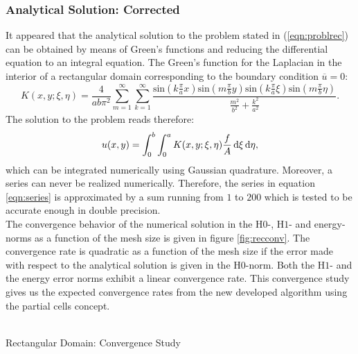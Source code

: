 \documentclass[a4paper,12pt]{article}
\makeatletter
\newcommand{\intd}{\,{\rm d}}
\newenvironment{figurehere}
  {\def\@captype{figure}}
  {}
\makeatother
\begin{document}
\subsubsection{Analytical Solution: Corrected}
It appeared that the analytical solution to the problem stated in (\ref{eqn:problrec}) can be obtained by means of Green's functions and reducing the differential equation to an integral equation. The Green's function for the Laplacian in the interior of a rectangular domain corresponding to the boundary condition $\overline{u}=0$:
\begin{equation}\label{eqn:series}
 K(x,y;\xi,\eta) = \frac{4}{ab\pi^2}\sum_{m=1}^{\infty}\sum_{k=1}^{\infty}\frac{\text{sin}(k\frac{\pi}{a}x)\text{sin}(m\frac{\pi}{b}y)\text{sin}(k\frac{\pi}{a}\xi)\text{sin}(m\frac{\pi}{b}\eta)}{\frac{m^2}{b^2}+\frac{k^2}{a^2}}.
\end{equation}
The solution to the problem reads therefore:
\begin{equation}
 u(x,y) = \int_0^b \int_0^a K(x,y;\xi,\eta)\frac{f}{A} \intd \xi \intd \eta,
\end{equation}
which can be integrated numerically using Gaussian quadrature. Moreover, a series can never be realized numerically. Therefore, the series in equation \ref{eqn:series} is approximated by a sum running from $1$ to $200$ which is tested to be accurate enough in double precision.\\
The convergence behavior of the numerical solution in the H$0$-, H$1$- and energy-norms as a function of the mesh size is given in figure \ref{fig:recconv}. The convergence rate is quadratic as a function of the mesh size if the error made with respect to the analytical solution is given in the H$0$-norm. Both the H$1$- and the energy error norms exhibit a linear convergence rate. This convergence study gives us the expected convergence rates from the new developed algorithm using the partial cells concept.
\begin{center}
\begin{figurehere}
\\
\caption{Rectangular Domain: Convergence Study}\label{fig:recconv}
\end{figurehere}
\end{center}
\end{document}
